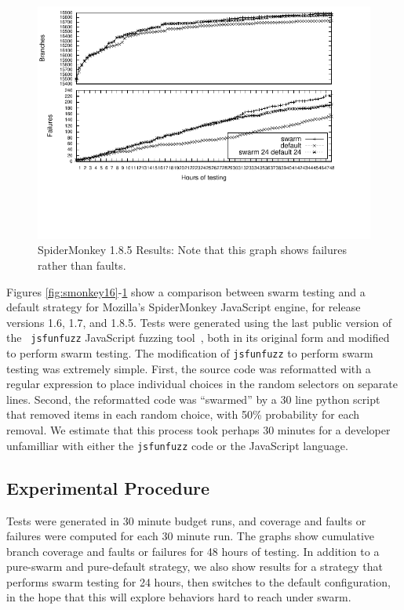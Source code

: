 \begin{figure}[b]
  \centering
  \includegraphics[width=\textwidth]{../graphs/SpiderMonkey/js185}
  \vspace{-1.5in}
  \caption{SpiderMonkey 1.8.5 Results:  Note that this graph shows failures rather than faults.}
  \label{fig:smonkey185}
\end{figure}

Figures \ref{fig:smonkey16}-\ref{fig:smonkey185} show a comparison
between swarm testing and a default strategy for Mozilla's
SpiderMonkey JavaScript engine, for release versions 1.6, 1.7, and
1.8.5.  Tests were generated using the last public version of the {\tt
jsfunfuzz} JavaScript fuzzing tool~\cite{jsfunfuzz}, both in its
original form and modified to perform swarm testing.  The modification
of {\tt jsfunfuzz} to perform swarm testing was extremely simple.
First, the source code was reformatted with a regular expression to
place individual choices in the random selectors on separate lines.
Second, the reformatted code was ``swarmed'' by a 30 line python
script that removed items in each random choice, with 50\% probability
for each removal.  We estimate that this process took perhaps 30
minutes for a developer unfamilliar with either the {\tt jsfunfuzz}
code or the JavaScript language.

\subsection{Experimental Procedure}

Tests were generated in 30 minute budget runs, and coverage and
faults or failures were computed for each 30 minute run.  The graphs
show cumulative branch coverage and faults or failures for 48 hours of
testing.  In addition to a pure-swarm and pure-default strategy, we
also show results for a strategy that performs swarm testing for 24
hours, then switches to the default configuration, in the hope that
this will explore behaviors hard to reach under swarm.

